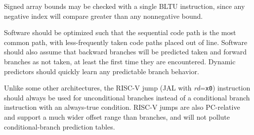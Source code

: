 \begin{commentary}
Signed array bounds may be checked with a single BLTU instruction, since
any negative index will compare greater than any nonnegative bound.
\end{commentary}

Software should be optimized such that the sequential code path is the
most common path, with less-frequently taken code paths placed out of
line.  Software should also assume that backward branches will be
predicted taken and forward branches as not taken, at least the
first time they are encountered.  Dynamic predictors should quickly
learn any predictable branch behavior.

Unlike some other architectures, the RISC-V jump (JAL with {\em
  rd}={\tt x0}) instruction should always be used for unconditional
branches instead of a conditional branch instruction with an
always-true condition.  RISC-V jumps are also PC-relative and support
a much wider offset range than branches, and will not pollute
conditional-branch prediction tables.


